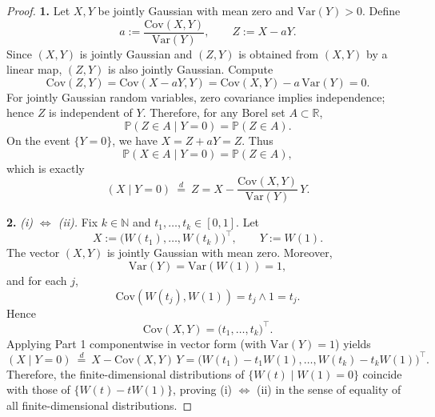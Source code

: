 \documentclass[12pt]{article}
\renewcommand{\(}{\left(}%
\renewcommand{\)}{\right)}%
\renewcommand{\[}{\left[}%
\renewcommand{\]}{\right]}%
\newtheorem{proof}{Proof.}}
\begin{document}
\begin{proof}
\textbf{1.}
Let $X,Y$ be jointly Gaussian with mean zero and $\mathrm{Var}(Y)>0$. Define
\begin{equation*}
a:=\frac{\mathrm{Cov}(X,Y)}{\mathrm{Var}(Y)},\qquad Z:=X-aY.
\end{equation*}
Since $(X,Y)$ is jointly Gaussian and $(Z,Y)$ is obtained from $(X,Y)$ by a linear map, $(Z,Y)$ is also jointly Gaussian. Compute
\begin{equation*}
\mathrm{Cov}(Z,Y)=\mathrm{Cov}(X-aY,Y)=\mathrm{Cov}(X,Y)-a\,\mathrm{Var}(Y)=0.
\end{equation*}
For jointly Gaussian random variables, zero covariance implies independence; hence $Z$ is independent of $Y$. Therefore, for any Borel set $A\subset\mathbb R$,
\begin{equation*}
\mathbb P(Z\in A\mid Y=0)=\mathbb P(Z\in A).
\end{equation*}
On the event $\{Y=0\}$, we have $X=Z+aY=Z$. Thus
\begin{equation*}
\mathbb P(X\in A\mid Y=0)=\mathbb P(Z\in A),
\end{equation*}
which is exactly
\begin{equation*}
(X\mid Y=0)\ \stackrel{d}{=}\ Z=X-\frac{\mathrm{Cov}(X,Y)}{\mathrm{Var}(Y)}\,Y.
\end{equation*}

\medskip
\noindent
\textbf{2.}
\emph{(i) $\Leftrightarrow$ (ii).}
Fix $k\in\mathbb N$ and $t_1,\dots,t_k\in[0,1]$. Let
\begin{equation*}
X:=\big(W(t_1),\dots,W(t_k)\big)^\top,\qquad Y:=W(1).
\end{equation*}
The vector $(X,Y)$ is jointly Gaussian with mean zero. Moreover,
\begin{equation*}
\mathrm{Var}(Y)=\mathrm{Var}(W(1))=1,
\end{equation*}
and for each $j$,
\begin{equation*}
\mathrm{Cov}(W(t_j),W(1))=t_j\wedge 1=t_j.
\end{equation*}
Hence
\begin{equation*}
\mathrm{Cov}(X,Y)=\big(t_1,\dots,t_k\big)^\top.
\end{equation*}
Applying Part 1 componentwise in vector form (with $\mathrm{Var}(Y)=1$) yields
\begin{equation*}
(X\mid Y=0)\ \stackrel{d}{=}\ X-\mathrm{Cov}(X,Y)\,Y
=\big(W(t_1)-t_1W(1),\dots,W(t_k)-t_kW(1)\big)^\top.
\end{equation*}
Therefore, the finite-dimensional distributions of $\{W(t)\mid W(1)=0\}$ coincide with those of $\{W(t)-tW(1)\}$, proving (i) $\Leftrightarrow$ (ii) in the sense of equality of all finite-dimensional distributions.


\end{proof}
\end{document}
